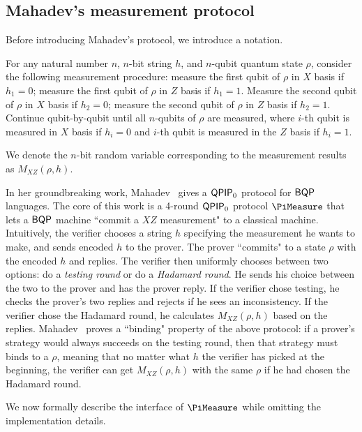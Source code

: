 \subsection{Mahadev's measurement protocol}\label{sec:urmila4}

Before introducing Mahadev's protocol, we introduce a notation.

\begin{definition}[$M_{XZ}(\rho,h)$]

For any natural number $n$, $n$-bit string $h$, and $n$-qubit quantum state $\rho$, consider the following measurement procedure: measure the first qubit of $\rho$ in $X$ basis if $h_1=0$; measure the first qubit of $\rho$ in $Z$ basis if $h_1=1$.  Measure the second qubit of $\rho$ in $X$ basis if $h_2=0$; measure the second qubit of $\rho$ in $Z$ basis if $h_2=1$. Continue qubit-by-qubit until all $n$-qubits of $\rho$ are measured, where $i$-th qubit is measured in $X$ basis if $h_i=0$ and  $i$-th qubit is measured in the $Z$ basis if $h_i=1$.

We denote the $n$-bit random variable corresponding to the measurement results as $M_{XZ}(\rho,h)$.

\end{definition}

In her groundbreaking work, Mahadev~\cite{FOCS:Mahadev18a} gives a $\operatorname{\mathsf{QPIP}}_0$ protocol for $\operatorname{\mathsf{BQP}}$ languages.
The core of this work is a 4-round $\operatorname{\mathsf{QPIP}}_0$ protocol $\PiMeasure$ that lets a $\operatorname{\mathsf{BQP}}$ machine ``commit a $XZ$ measurement" to a classical machine.
Intuitively, the verifier chooses a string $h$ specifying  the measurement he wants to make, and sends encoded $h$  to the prover. The prover ``commits" to a state $\rho$ with the encoded $h$ and replies. The verifier then uniformly chooses between two options: do a \emph{testing round} or do a \emph{Hadamard round}. He sends his choice between the two to the prover and has the  prover reply. If the verifier chose testing, he checks the prover's two replies and rejects if he sees an inconsistency. If the verifier chose the Hadamard round, he calculates $M_{XZ}(\rho,h)$ based on the replies. Mahadev~\cite{FOCS:Mahadev18a} proves a ``binding" property of the above protocol: if a prover's strategy would always succeeds on the testing round, then that strategy must binds to a $\rho$, meaning that no matter what $h$ the verifier has picked at the beginning, the verifier can get $M_{XZ}(\rho,h)$  with the same $\rho$ if he had chosen the Hadamard round.

We now formally describe the interface of $\PiMeasure$ while omitting the implementation details.

